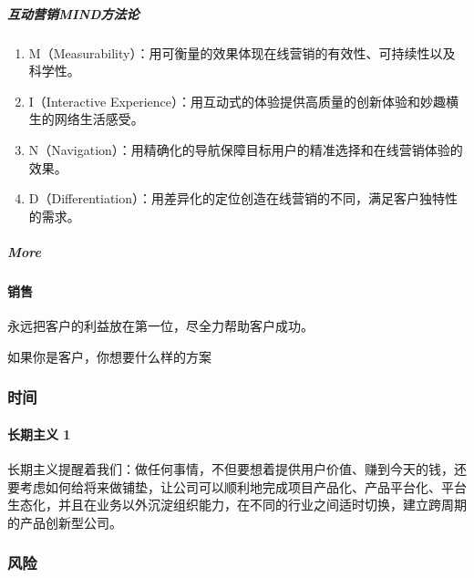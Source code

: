 \documentclass[letterpaper,10pt,english]{sphinxmanual}
\begin{document}
\subparagraph{互动营销MIND方法论}
\label{\detokenize{chapter_idea/GTM:mind}}\begin{enumerate}
%
\item {} 
M（Measurability）：用可衡量的效果体现在线营销的有效性、可持续性以及科学性。

\item {} 
I（Interactive
Experience）：用互动式的体验提供高质量的创新体验和妙趣横生的网络生活感受。

\item {} 
N（Navigation）：用精确化的导航保障目标用户的精准选择和在线营销体验的效果。

\item {} 
D（Differentiation）：用差异化的定位创造在线营销的不同，满足客户独特性的需求。

\end{enumerate}


\subparagraph{More}
\label{\detokenize{chapter_idea/GTM:more}}


\paragraph{销售}
\label{\detokenize{chapter_idea/GTM:id20}}
永远把客户的利益放在第一位，尽全力帮助客户成功。

如果你是客户，你想要什么样的方案


\subsubsection{时间}
\label{\detokenize{chapter_idea/time:id1}}\label{\detokenize{chapter_idea/time::doc}}

\paragraph{长期主义 1\sphinxfootnotemark[475]}
\label{\detokenize{chapter_idea/time:id2}}%
\begin{footnotetext}[475]\sphinxAtStartFootnote
{}
%
\end{footnotetext}\ignorespaces 
长期主义提醒着我们：做任何事情，不但要想着提供用户价值、赚到今天的钱，还要考虑如何给将来做铺垫，让公司可以顺利地完成项目产品化、产品平台化、平台生态化，并且在业务以外沉淀组织能力，在不同的行业之间适时切换，建立跨周期的产品创新型公司。


\subsubsection{风险}
\label{\detokenize{chapter_idea/risk:id1}}\label{\detokenize{chapter_idea/risk::doc}}
\end{document}

